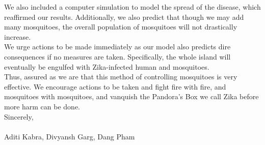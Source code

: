 \documentclass{article}
\begin{document}
We also included a computer simulation to model the spread of the disease, which reaffirmed our results. Additionally, we also predict that though we may add many mosquitoes, the overall population of mosquitoes will not drastically increase.\\

We urge actions to be made immediately as our model also predicts dire consequences if no measures are taken. Specifically, the whole island will eventually be engulfed with Zika-infected human and mosquitoes.\\

Thus, assured as we are that this method of controlling mosquitoes is very effective. We encourage actions to be taken and fight fire with fire, and mosquitoes with mosquitoes, and vanquish the Pandora’s Box we call Zika before more harm can be done. \\

Sincerely,\\ \\

Aditi Kabra, Divyansh Garg, Dang Pham
\end{document}
